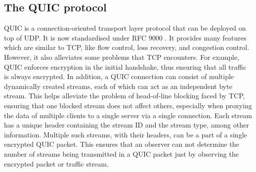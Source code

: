 \subsection{The QUIC protocol}
\label{subsec:netshaper-background-quic}

QUIC is a connection-oriented transport layer protocol that can be deployed on top of UDP.
It is now standardised under RFC 9000 \cite{quic_rfc}.
It provides many features which are similar to TCP, like flow control, loss recovery, and congestion control. 
However, it also alleviates some problems that TCP encounters.
For example, QUIC enforces encryption in the initial handshake, thus ensuring that all traffic is always encrypted.
In addition, a QUIC connection can consist of multiple dynamically created streams, each of which can act as an independent byte stream. 
This helps alleviate the problem of head-of-line blocking faced by TCP, ensuring that one blocked stream does not affect others, especially when proxying the data of multiple clients to a single server via a single connection.
Each stream has a unique header containing the stream ID and the stream type, among other information.
Multiple such streams, with their headers, can be a part of a single encrypted QUIC packet.
This ensures that an observer can not determine the number of streams being transmitted in a QUIC packet just by observing the encrypted packet or traffic stream.


